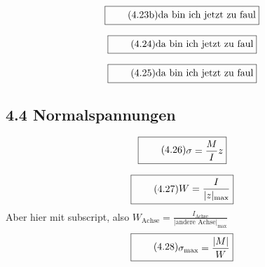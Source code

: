 \documentclass[11pt]{article}
\newcommand{\1}{ {\mathds{1}} }
\newcommand{\abs}[1]{\lvert#1\rvert}
\begin{document}
    \begin{equation}
      \boxed{
        \tag{4.23b}
        \begin{split}
          \text{da bin ich jetzt zu faul}
        \end{split}
      }
    \end{equation}

    \begin{equation}
      \boxed{
        \tag{4.24}
        \begin{split}
          \text{da bin ich jetzt zu faul}
        \end{split}
      }
    \end{equation}

    \begin{equation}
      \boxed{
        \tag{4.25}
        \begin{split}
          \text{da bin ich jetzt zu faul}
        \end{split}
      }
    \end{equation}
    
    \subsection*{4.4 Normalspannungen}

    \begin{equation}
      \boxed{
        \tag{4.26}
        \begin{split}
          \sigma
          =
          \frac{M}{I}
          z
        \end{split}
      }
    \end{equation}
    
    \begin{equation}
      \boxed{
        \tag{4.27}
        \begin{split}
          W
          =
          \frac{I}{\abs{z}_{\text{max}}}
        \end{split}
      }
    \end{equation}
    Aber hier mit subscript, also $\displaystyle W_{\text{Achse}} = \frac{I_{\text{Achse}}}{\abs{\text{andere Achse}}_{\text{max}}}$
    \begin{equation}
      \boxed{
        \tag{4.28}
        \begin{split}
          \sigma_{\text{max}}
          =
          \frac{\abs{M}}{W}
        \end{split}
      }
    \end{equation}
    
\end{document}
